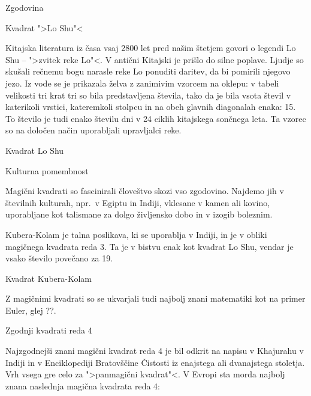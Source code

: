 \documentclass[a4paper,12pt]{article}
\begin{document}

Zgodovina

Kvadrat ">Lo Shu"<

Kitajska literatura iz časa vsaj 2800 let pred našim štetjem govori o legendi
Lo Shu -- ">zvitek reke Lo"<. V antični Kitajski je prišlo do
silne poplave. Ljudje so skušali rečnemu bogu narasle reke Lo ponuditi daritev,
da bi pomirili njegovo jezo. Iz vode se je prikazala želva z zanimivim vzorcem
na oklepu: v tabeli velikosti tri krat tri so bila predstavljena števila, tako
da je bila vsota števil v katerikoli vrstici, kateremkoli stolpcu in na obeh
glavnih diagonalah enaka: 15. To število je tudi enako številu dni v 24 ciklih
kitajskega sončnega leta. Ta vzorec so na določen način uporabljali upravljalci
reke.

Kvadrat Lo Shu


Kulturna pomembnost

Magični kvadrati so fascinirali človeštvo skozi vso zgodovino. Najdemo jih
v številnih kulturah, npr.\ v Egiptu in Indiji, vklesane v kamen ali
kovino, uporabljane kot talismane za dolgo življensko dobo in v
izogib boleznim.

Kubera-Kolam je talna poslikava, ki se uporablja v Indiji, in je v
obliki magičnega kvadrata reda 3. Ta je v bistvu enak kot kvadrat
Lo Shu, vendar je vsako število povečano za 19.

Kvadrat Kubera-Kolam

Z magičnimi kvadrati so se ukvarjali tudi najbolj znani matematiki kot na
primer Euler, glej ??.


Zgodnji kvadrati reda 4

Najzgodnejši znani magični kvadrat reda 4 je bil odkrit na napisu
v Khajurahu v Indiji in v Enciklopediji Bratovščine Čistosti iz enajstega
ali dvanajstega stoletja. Vrh vsega gre celo za ">panmagični kvadrat"<.
V Evropi sta morda najbolj znana naslednja magična kvadrata reda 4:
\end{document}
